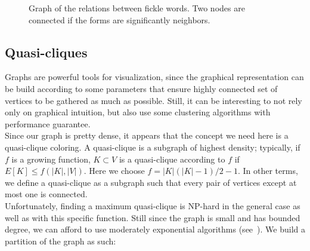 \documentclass{elsarticle}
\begin{document}
\begin{figure}[h!]

\caption{Graph of the relations between fickle words. Two nodes are connected if the forms are significantly neighbors.}
\label{fig:graph1}
\end{figure}

\subsection{Quasi-cliques}

Graphs are powerful tools for visualization, since the graphical representation can be build according to some parameters that ensure highly connected set of vertices to be gathered as much as possible. Still, it can be interesting to not rely only on graphical intuition, but also use some clustering algorithms with performance guarantee.\\

Since our graph is pretty dense, it appears that the concept we need here is a quasi-clique coloring. A quasi-clique is a subgraph of highest density; typically, if $f$ is a growing function, $K \subset V$ is a quasi-clique according to $f$ if $E[K] \leq f(|K|,|V|)$. Here we choose $f=|K|(|K|-1)/2-1$. In other terms, we define a quasi-clique as a subgraph such that every pair of vertices except at most one is connected.\\

Unfortunately, finding a maximum quasi-clique is NP-hard in the general case as well as with this specific function. Still since the graph is small and has bounded degree, we can afford to use moderately exponential algorithms (see~\cite{qis}). We build a partition of the graph as such:\\
\end{document}
